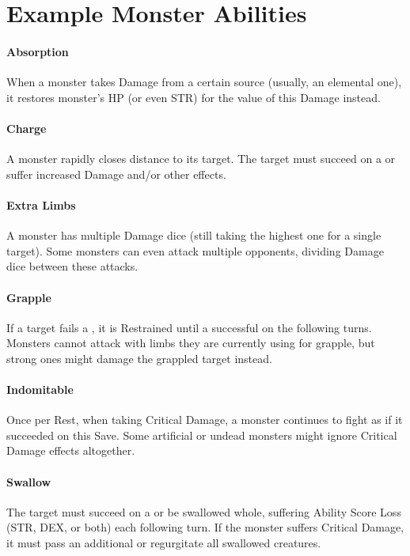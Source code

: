 \documentclass[itdr]{subfiles}
\begin{document}
\vfill
\break

\section{Example Monster Abilities}

\paragraph{Absorption}
When a monster takes Damage from a certain source (usually, an elemental one), it restores monster's HP (or even STR) for the value of this Damage instead.

\vfill
\paragraph{Charge}
A monster rapidly closes distance to its target. The target must succeed on a  or suffer increased Damage and/or other effects.

\vfill
\paragraph{Extra Limbs}
A monster has multiple Damage dice (still taking the highest one for a single target). Some monsters can even attack multiple opponents, dividing Damage dice between these attacks.

\vfill
\paragraph{Grapple}
If a target fails a , it is Restrained until a successful  on the following turns. Monsters cannot attack with limbs they are currently using for grapple, but strong ones might damage the grappled target instead.

\vfill
\paragraph{Indomitable}
Once per Rest, when taking Critical Damage, a monster continues to fight as if it succeeded on this Save. Some artificial or undead monsters might ignore Critical Damage effects altogether.

\vfill
\paragraph{Swallow}
The target must succeed on a  or be swallowed whole, suffering Ability Score Loss (STR, DEX, or both) each following turn. If the monster suffers Critical Damage, it must pass an additional  or regurgitate all swallowed creatures.
\end{document}
